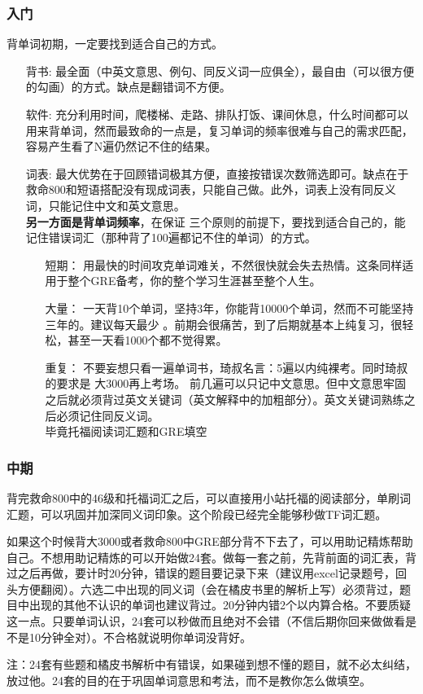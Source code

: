 \documentclass[11pt,a4paper]{article}
\begin{document}
{{{			\subsubsection*{入门}
				背单词初期，一定要找到适合自己的方式。
				\begin{enumerate}
					\item[背书:]
						最全面（中英文意思、例句、同反义词一应俱全），最自由（可以很方便的勾画）的方式。缺点是翻错词不方便。
					\item[软件:]
						充分利用时间，爬楼梯、走路、排队打饭、课间休息，什么时间都可以用来背单词，然而最致命的一点是，复习单词的频率很难与自己的需求匹配，容易产生看了N遍仍然记不住的结果。
					\item[词表:]
						最大优势在于回顾错词极其方便，直接按错误次数筛选即可。缺点在于救命800和短语搭配没有现成词表，只能自己做。此外，词表上没有同反义词，只能记住中文和英文意思。
						\\{\bfseries 另一方面是背单词频率}，在保证
						三个原则的前提下，要找到适合自己的，能记住错误词汇（那种背了100遍都记不住的单词）的方式。
						\begin{enumerate}
							\item[短期：]用最快的时间攻克单词难关，不然很快就会失去热情。这条同样适用于整个GRE备考，你的整个学习生涯甚至整个人生。
							\item[大量：]一天背10个单词，坚持3年，你能背10000个单词，然而不可能坚持三年的。建议每天最少
							。前期会很痛苦，到了后期就基本上纯复习，很轻松，甚至一天看1000个都不觉得累。
							\item[重复：]不要妄想只看一遍单词书，琦叔名言：5遍以内纯裸考。同时琦叔的要求是
							大3000再上考场。
							前几遍可以只记中文意思。但中文意思牢固之后就必须背过英文关键词（英文解释中的加粗部分）。英文关键词熟练之后必须记住同反义词。
							\\毕竟托福阅读词汇题和GRE填空
						\end{enumerate}			
				\end{enumerate}				
			\subsubsection*{中期}
				背完救命800中的46级和托福词汇之后，可以直接用小站托福的阅读部分，单刷词汇题，可以巩固并加深同义词印象。这个阶段已经完全能够秒做TF词汇题。
				\par 如果这个时候背大3000或者救命800中GRE部分背不下去了，可以用助记精炼帮助自己。不想用助记精炼的可以开始做24套。做每一套之前，先背前面的词汇表，背过之后再做，要计时20分钟，错误的题目要记录下来（建议用excel记录题号，回头方便翻阅）。六选二中出现的同义词（会在橘皮书里的解析上写）必须背过，题目中出现的其他不认识的单词也建议背过。20分钟内错2个以内算合格。不要质疑这一点。只要单词认识，24套可以秒做而且绝对不会错（不信后期你回来做做看是不是10分钟全对）。不合格就说明你单词没背好。
				\par 注：24套有些题和橘皮书解析中有错误，如果碰到想不懂的题目，就不必太纠结，放过他。24套的目的在于巩固单词意思和考法，而不是教你怎么做填空。
}}}
\end{document}
